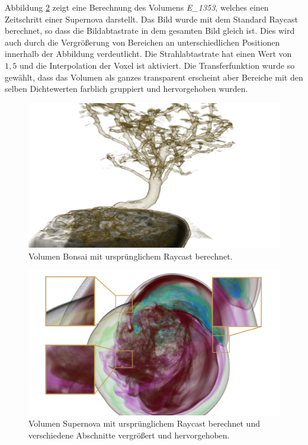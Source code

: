 Abbildung \ref{fig::res::sup_st} zeigt eine Berechnung des Volumens \emph{E\_1353}, welches einen Zeitschritt einer Supernova darstellt.
Das Bild wurde mit dem Standard Raycast berechnet, so dass die Bildabtastrate in dem gesamten Bild gleich ist.
Dies wird auch durch die Vergrößerung von Bereichen an unterschiedlichen Positionen innerhalb der Abbildung verdeutlicht.
Die Strahlabtastrate hat einen Wert von $1,5$ und die Interpolation der Voxel ist aktiviert.
Die Transferfunktion wurde so gewählt, dass das Volumen als ganzes transparent erscheint aber Bereiche mit den selben Dichtewerten farblich gruppiert und hervorgehoben wurden.

\begin{landscape}
	\begin{figure}
		\centering
		\includegraphics[width=\textheight]{../../Grafiken/results/picture_quality/bonsai/Standard_img-1_Ray-1-5.png}
		\caption{Volumen Bonsai mit ursprünglichem Raycast berechnet.}
		\label{fig::res::bon_st}
	\end{figure}
\end{landscape}

\begin{landscape}
	\begin{figure}
		\centering
		\includegraphics[width=\textheight]{../../Grafiken/results/picture_quality/supernova/Standard_img-1_Ray-1-5_edited.png}
		\caption{Volumen Supernova mit ursprünglichem Raycast berechnet und verschiedene Abschnitte vergrößert und hervorgehoben.}
		\label{fig::res::sup_st}
	\end{figure}
\end{landscape}

